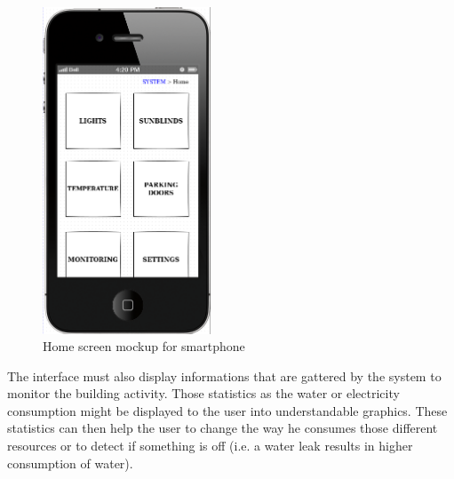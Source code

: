 \documentclass{acm_proc_article-sp}
\begin{document}
        \begin{figure}[htb]
          \begin{center}
            \includegraphics[width=5cm]{mockup2}
            \caption{Home screen mockup for smartphone\label{mockup2}}
          \end{center}
        \end{figure}

The interface must also display informations that are gattered by the system to monitor the building activity.
Those statistics as the water or electricity consumption might be displayed to the user into understandable graphics.
These statistics can then help the user to change the way he consumes those different resources or to detect if something is off (i.e. a water leak results in higher consumption of water).
\end{document}
